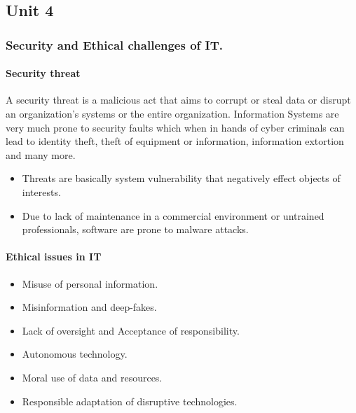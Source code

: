 \documentclass[twocolumn, 12pt, a4paper]{article}
\begin{document}
\twocolumn









\begin{tcolorbox}
  \part{Unit 4}
\end{tcolorbox}

\section{Security and Ethical challenges of IT.}
\subsection{Security threat}
A security threat is a malicious act that aims to corrupt or steal data or
disrupt an organization's systems or the entire organization. Information 
Systems are very much prone to security faults which when in hands of cyber
criminals can lead to identity theft, theft of equipment or information, 
information extortion and many more.
\begin{itemize}
  \item Threats are basically system vulnerability that negatively effect
    objects of interests.
  \item Due to lack of maintenance in a commercial environment or untrained
    professionals, software are prone to malware attacks.
\end{itemize}

\subsection{Ethical issues in IT}
\begin{itemize}
  \item Misuse of personal information.
  \item Misinformation and deep-fakes.
  \item Lack of oversight and Acceptance of responsibility.
  \item Autonomous technology.
  \item Moral use of data and resources.
  \item Responsible adaptation of disruptive technologies.
\end{itemize}
\end{document}

